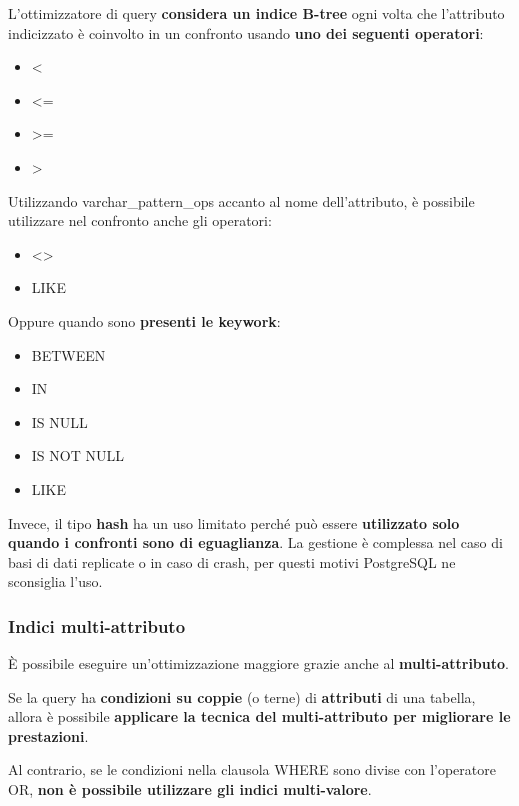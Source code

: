 \documentclass[a4paper]{article}
\begin{document}
	\noindent
	L'ottimizzatore di query \textbf{considera un indice \textcolor{Red3}{B-tree}} ogni volta che l'attributo indicizzato è coinvolto in un confronto usando \textbf{uno dei seguenti operatori}:
	\begin{itemize}
		\item <
		\item <=
		\item >=
		\item >
	\end{itemize}
	Utilizzando \textsf{varchar\_pattern\_ops} accanto al nome dell'attributo, è possibile utilizzare nel confronto anche gli operatori:
	\begin{itemize}
		\item <>
		\item \textsf{LIKE}
	\end{itemize}
	Oppure quando sono \textbf{presenti le keywork}:
	\begin{itemize}
		\item \textsf{BETWEEN}
		\item \textsf{IN}
		\item \textsf{IS NULL}
		\item \textsf{IS NOT NULL}
		\item \textsf{LIKE}
	\end{itemize}
	Invece, il tipo \textcolor{Red3}{\textbf{hash}} ha un uso limitato perché può essere \textbf{utilizzato solo quando i confronti sono di eguaglianza}. La gestione è complessa nel caso di basi di dati replicate o in caso di crash, per questi motivi PostgreSQL ne sconsiglia l'uso.\newpage

	\subsubsection{Indici multi-attributo}
	
	È possibile eseguire un'ottimizzazione maggiore grazie anche al \textcolor{Red3}{\textbf{multi-attributo}}.\newline

	\noindent
	Se la query ha \textbf{condizioni su coppie} (o terne) di \textbf{attributi} di una tabella, allora è possibile \textbf{applicare la tecnica del multi-attributo per migliorare le prestazioni}.\newline

	\noindent
	Al contrario, se le condizioni nella clausola \textsf{WHERE} sono divise con l'operatore \textsf{OR}, \textbf{non è possibile utilizzare gli indici multi-valore}.\newline
\end{document}
